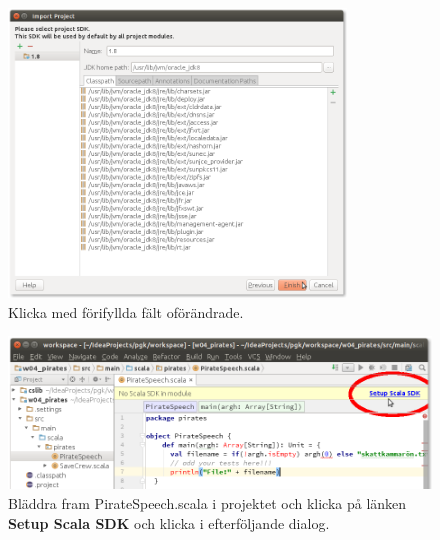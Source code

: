 \begin{figure}
\centering
\includegraphics[width=0.8\textwidth]{../img/intellij/idea-import6-select-SDK.png}
\caption{Klicka  med förifyllda fält oförändrade.}
\label{fig:idea:import6-select-SDK}
\end{figure}

\begin{figure}
\centering
\includegraphics[width=1.0\textwidth]{../img/intellij/idea-import7-setup-scala-sdk.png}

\caption{Bläddra fram PirateSpeech.scala i projektet  och klicka på länken \textbf{Setup Scala SDK} och klicka  i efterföljande dialog.}
\label{fig:idea:import78-setup-scala-sdk}
\end{figure}

